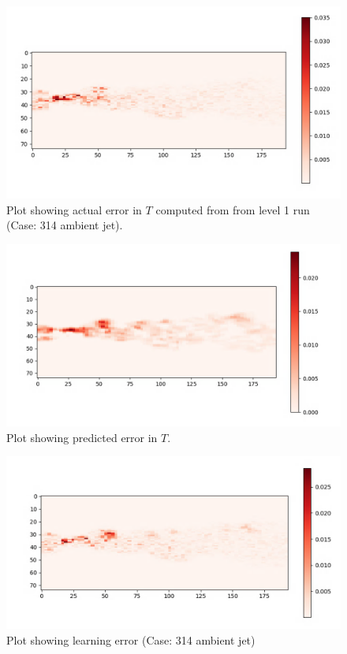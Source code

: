 \documentclass{article}
\begin{document}
\begin{figure}[h!]
    \centering
    \includegraphics[width = 0.85\linewidth]{figures/314_01_cnn_actual.png}
    \caption{Plot showing actual error in $T$ computed from from level 1 run (Case: 314 ambient jet).}
    \label{amr_err}
\end{figure}

\begin{figure}[h!]
    \centering
    \includegraphics[width = 0.9\linewidth]{figures/314_01_cnn_pred.png}
    \caption{Plot showing predicted error in $T$.}
    \label{amr_err}
\end{figure}

\begin{figure}[h!]
    \centering
    \includegraphics[width = 0.9\linewidth]{figures/314_01_cnn_error.png}
    \caption{Plot showing learning error (Case: 314 ambient jet)}
    \label{amr_err}
\end{figure}
\end{document}
